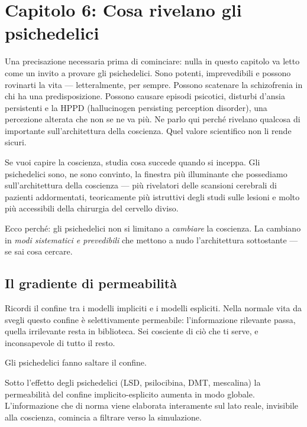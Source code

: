 \documentclass[11pt, twoside, openright]{book}
\begin{document}
\chapter*{Capitolo 6: Cosa rivelano gli psichedelici}

Una precisazione necessaria prima di cominciare: nulla in questo capitolo va letto come un invito a provare gli psichedelici. Sono potenti, imprevedibili e possono rovinarti la vita --- letteralmente, per sempre. Possono scatenare la schizofrenia in chi ha una predisposizione. Possono causare episodi psicotici, disturbi d'ansia persistenti e la HPPD (hallucinogen persisting perception disorder), una percezione alterata che non se ne va più. Ne parlo qui perché rivelano qualcosa di importante sull'architettura della coscienza. Quel valore scientifico non li rende sicuri.

Se vuoi capire la coscienza, studia cosa succede quando si inceppa. Gli psichedelici sono, ne sono convinto, la finestra più illuminante che possediamo sull'architettura della coscienza --- più rivelatori delle scansioni cerebrali di pazienti addormentati, teoricamente più istruttivi degli studi sulle lesioni e molto più accessibili della chirurgia del cervello diviso.

Ecco perché: gli psichedelici non si limitano a \textit{cambiare} la coscienza. La cambiano in \textit{modi sistematici e prevedibili} che mettono a nudo l'architettura sottostante --- se sai cosa cercare.

\section*{Il gradiente di permeabilità}

Ricordi il confine tra i modelli impliciti e i modelli espliciti. Nella normale vita da svegli questo confine è selettivamente permeabile: l'informazione rilevante passa, quella irrilevante resta in biblioteca. Sei cosciente di ciò che ti serve, e inconsapevole di tutto il resto.

Gli psichedelici fanno saltare il confine.

Sotto l'effetto degli psichedelici (LSD, psilocibina, DMT, mescalina) la permeabilità del confine implicito-esplicito aumenta in modo globale. L'informazione che di norma viene elaborata interamente sul lato reale, invisibile alla coscienza, comincia a filtrare verso la simulazione.
\end{document}
